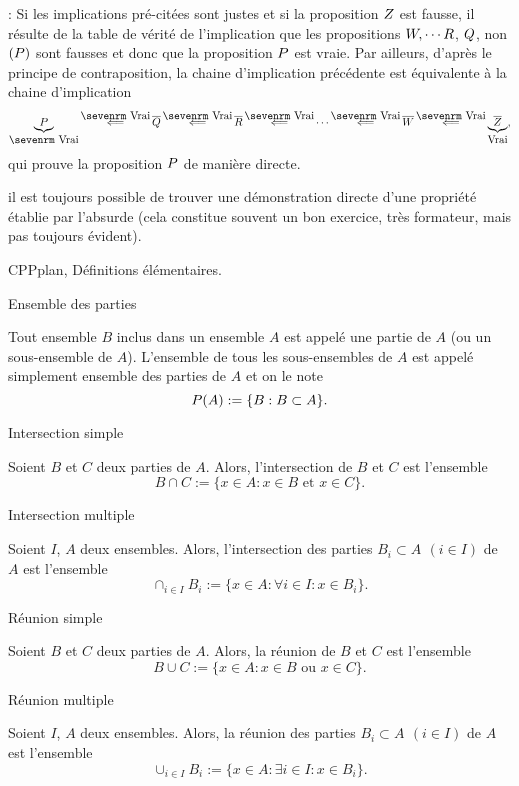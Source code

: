 \Remarque : Si les implications pr\'e-cit\'ees sont justes et si la proposition $\sc Z$ est fausse, il r\'esulte de la table de v\'erit\'e de l'implication que les propositions $\sc W,\cdots \sc R$, $\sc Q$, non $(\sc P)$ sont fausses et donc que la proposition $\sc P$ est vraie. 
Par ailleurs, d'apr\`es le principe de contraposition, la chaine d'implication pr\'ec\'edente est \'equivalente \`a la chaine d'implication 
$$
\underbrace{\sc P}_{\mbox{\sevenrm Vrai}}\mathop{\Longleftarrow}\limits^{\mbox{\sevenrm Vrai}}
\overline{\sc Q}\mathop{\Longleftarrow}\limits^{\mbox{\sevenrm Vrai}}\overline{\sc R}
\mathop{\Longleftarrow}\limits^{\mbox{\sevenrm Vrai}}\cdots
\mathop{\Longleftarrow}\limits^{\mbox{\sevenrm Vrai}}\overline{\sc W}
\mathop{\Longleftarrow}\limits^{\mbox{\sevenrm Vrai}}
\underbrace{\overline{\sc Z}}_{\mbox{Vrai}},
$$
qui prouve la proposition $\sc P$ de mani\`ere directe. 

 il est toujours possible de trouver une d\'emonstration directe d'une propri\'et\'e \'etablie par l'absurde (cela constitue souvent un bon exercice, tr\`es formateur, mais pas toujours \'evident). 
\bigskip

\Section CPPplan, D\'efinitions \'el\'ementaires. 

\Concept Ensemble des parties

Tout ensemble $B$ inclus dans un ensemble $A$ est appel\'e une partie de $A$ (ou un sous-ensemble de $A$). \pn
L'ensemble de tous les sous-ensembles de $A$ est appel\'e simplement ensemble des parties de $A$ et on le note
$$
\sc P(A):=\{B:B\subset A\}.
$$

\Concept Intersection simple

Soient $B$ et $C$ deux parties de $A$. Alors, l'intersection de $B$ et $C$ est l'ensemble
$$
B\cap C:=\{x\in A:x\in B \mbox{ et }x\in C\}.
$$

\Concept Intersection multiple

Soient $I$, $A$ deux ensembles. Alors, l'intersection des parties $B_i\subset A\ \,(i\in I)$ de $A$ est l'ensemble 
$$
\cap_{i\in I}B_i:=\{x\in A:\forall i\in I:x\in B_i\}.
$$ 


\Concept R\'eunion simple

Soient $B$ et $C$ deux parties de $A$. Alors, la r\'eunion de $B$ et $C$ est l'ensemble 
$$
B\cup C:=\{x\in A:x\in B \mbox{ ou }x\in C\}.
$$

\Concept R\'eunion multiple

Soient $I$, $A$ deux ensembles. Alors, la r\'eunion des parties $B_i\subset A\ \,(i\in I)$ de $A$ est l'ensemble 
$$
\cup_{i\in I}B_i:=\{x\in A:\exists i\in I:x\in B_i\}.
$$ 

